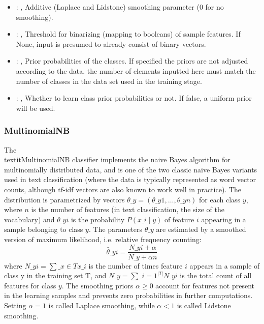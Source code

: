 \begin{itemize}
    \item {}: , 
      Additive (Laplace and Lidstone) smoothing parameter (0 for no smoothing).

    \item {}: , 
      Threshold for binarizing (mapping to booleans) of sample features. If None,
      input is presumed to already consist of binary vectors.

    \item {}: , 
      Prior probabilities of the classes. If specified the priors are
      not adjusted according to the data. \nb the number of elements inputted here must
      match the number of classes in the data set used in the training stage.

    \item {}: , 
      Whether to learn class prior probabilities or not. If false, a uniform
      prior will be used.
  \end{itemize}


\subsubsection{MultinomialNB}
  The \\textit{MultinomialNB} classifier implements the naive Bayes algorithm for
  multinomially distributed data, and is one of the two classic naive Bayes
  variants used in text classification (where the data is typically represented
  as word vector counts, although tf-idf vectors are also known to work well in
  practice).                         The distribution is parametrized by vectors $\theta\_y =
  (\theta\_{y1},\ldots,\theta\_{yn})$ for each class $y$, where $n$ is the number of
  features (in text classification, the size of the vocabulary) and $\theta\_{yi}$
  is the probability $P(x\_i \mid y)$ of feature $i$ appearing in a sample
  belonging to class $y$.                         The parameters $\theta\_y$ are estimated by a
  smoothed version of maximum                         likelihood, i.e. relative frequency counting:
  \begin{equation}                         \hat{\theta}\_{yi} = \frac{ N\_{yi} + \alpha}{N\_y + \alpha
  n}                         \end{equation}                         where $N\_{yi} = \sum\_{x \in T}
  x\_i$ is the number of times feature $i$ appears                         in a sample of class y in
  the training set T, and                         $N\_{y} = \sum\_{i=1}^{|T|} N\_{yi}$ is the total
  count of all features for class                         $y$.                         The smoothing
  priors $\alpha \ge 0$ account for features not present in the                         learning
  samples and prevents zero probabilities in further computations.                         Setting
  $\alpha = 1$ is called Laplace smoothing, while $\alpha < 1$ is called
  Lidstone smoothing.                         

